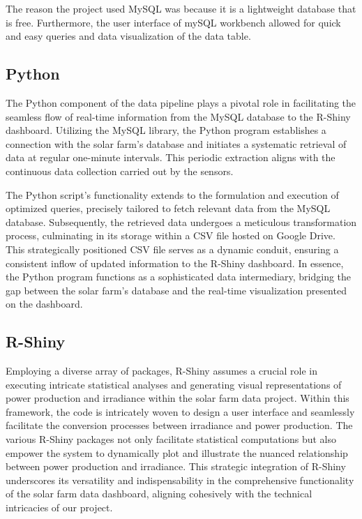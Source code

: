 \documentclass{sigchi}
\begin{document}
The reason the project used MySQL was because it is a lightweight database that is free. Furthermore, the user interface of mySQL workbench allowed for quick and easy queries and data visualization of the data table.
\subsection{Python}
The Python component of the data pipeline plays a pivotal role in facilitating the seamless flow of real-time information from the MySQL database to the R-Shiny dashboard. Utilizing the MySQL library\cite{5_MySQL}, the Python program establishes a connection with the solar farm's database and initiates a systematic retrieval of data at regular one-minute intervals. This periodic extraction aligns with the continuous data collection carried out by the sensors.

The Python script's functionality extends to the formulation and execution of optimized queries, precisely tailored to fetch relevant data from the MySQL database. Subsequently, the retrieved data undergoes a meticulous transformation process, culminating in its storage within a CSV file hosted on Google Drive. This strategically positioned CSV file serves as a dynamic conduit, ensuring a consistent inflow of updated information to the R-Shiny dashboard. In essence, the Python program functions as a sophisticated data intermediary, bridging the gap between the solar farm's database and the real-time visualization presented on the dashboard.

\subsection{R-Shiny}
Employing a diverse array of packages, R-Shiny assumes a crucial role in executing intricate statistical analyses and generating visual representations of power production and irradiance within the solar farm data project. Within this framework, the code is intricately woven to design a user interface and seamlessly facilitate the conversion processes between irradiance and power production. The various R-Shiny packages not only facilitate statistical computations but also empower the system to dynamically plot and illustrate the nuanced relationship between power production and irradiance. This strategic integration of R-Shiny underscores its versatility and indispensability in the comprehensive functionality of the solar farm data dashboard, aligning cohesively with the technical intricacies of our project.
\end{document}
